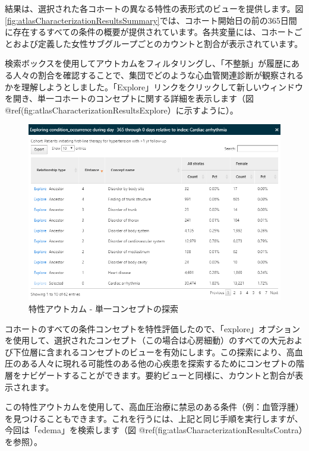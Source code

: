 \documentclass[
  11pt]{book}
\theoremstyle{definition}
\theoremstyle{definition}
\theoremstyle{definition}
\theoremstyle{definition}
\theoremstyle{remark}
\begin{document}
結果は、選択された各コホートの異なる特性の表形式のビューを提供します。図 \ref{fig:atlasCharacterizationResultsSummary}では、コホート開始日の前の365日間に存在するすべての条件の概要が提供されています。各共変量には、コホートごとおよび定義した女性サブグループごとのカウントと割合が表示されています。

検索ボックスを使用してアウトカムをフィルタリングし、「不整脈」が履歴にある人々の割合を確認することで、集団でどのような心血管関連診断が観察されるかを理解しようとしました。「Explore」リンクをクリックして新しいウィンドウを開き、単一コホートのコンセプトに関する詳細を表示します（図 @ref(fig:atlasCharacterizationResultsExplore）に示すように）。

\begin{figure}

{\centering \includegraphics[width=1\linewidth]{images/Characterization/atlasCharacterizationResultsExplore} 

}

\caption{特性アウトカム - 単一コンセプトの探索}\label{fig:atlasCharacterizationResultsExplore}
\end{figure}

コホートのすべての条件コンセプトを特性評価したので、「explore」オプションを使用して、選択されたコンセプト（この場合は心房細動）のすべての大元および下位層に含まれるコンセプトのビューを有効にします。この探索により、高血圧のある人々に現れる可能性のある他の心疾患を探索するためにコンセプトの階層をナビゲートすることができます。要約ビューと同様に、カウントと割合が表示されます。

この特性アウトカムを使用して、高血圧治療に禁忌のある条件（例：血管浮腫）を見つけることもできます。これを行うには、上記と同じ手順を実行しますが、今回は「edema」を検索します（図 @ref(fig:atlasCharacterizationResultsContra）を参照）。
\end{document}
